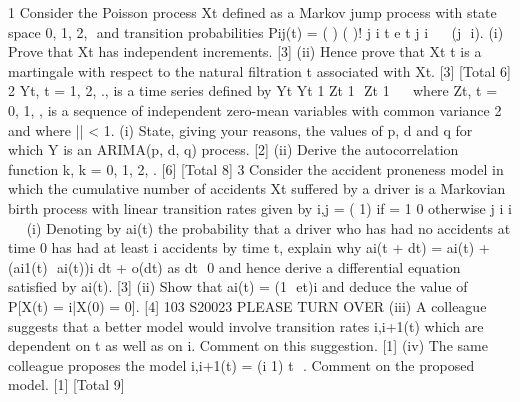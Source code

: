 \documentclass[a4paper,12pt]{article}
\begin{document}
\begin{enumerate}
1 Consider the Poisson process Xt defined as a Markov jump process with state space
{0, 1, 2, } and transition probabilities
Pij(t) = ( )
( )!
j i
t e t
j i

 

(j  i).
(i) Prove that Xt has independent increments. [3]
(ii) Hence prove that Xt t is a martingale with respect to the natural filtration t
associated with Xt. [3]
[Total 6]
2 Yt, t = 1, 2, ., is a time series defined by
Yt Yt 1 Zt 1  Zt 1  
   
where Zt, t = 0, 1, , is a sequence of independent zero-mean variables with
common variance 2 and where || < 1.
(i) State, giving your reasons, the values of p, d and q for which Y is an
ARIMA(p, d, q) process. [2]
(ii) Derive the autocorrelation function 	k, k = 0, 1, 2, . [6]
[Total 8]
3 Consider the accident proneness model in which the cumulative number of accidents
Xt suffered by a driver is a Markovian birth process with linear transition rates given
by
i,j =
( 1) if = 1
0 otherwise
j i i    
(i) Denoting by ai(t) the probability that a driver who has had no accidents at
time 0 has had at least i accidents by time t, explain why
ai(t + dt) = ai(t) + (ai1(t)  ai(t))i
dt + o(dt)
as dt  0 and hence derive a differential equation satisfied by ai(t). [3]
(ii) Show that
ai(t) = (1  et)i
and deduce the value of P[X(t) = i|X(0) = 0]. [4]
103 S20023 PLEASE TURN OVER
(iii) A colleague suggests that a better model would involve transition rates i,i+1(t)
which are dependent on t as well as on i. Comment on this suggestion. [1]
(iv) The same colleague proposes the model i,i+1(t) = (i 1)
t
 . Comment on the
proposed model. [1]
[Total 9]



\end{enumerate}
\end{document}
